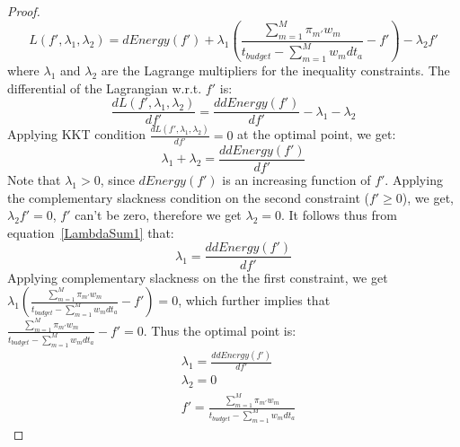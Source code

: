 \documentclass[11pt, letterpaper]{article}
\begin{document}
\begin{proof}
\begin{displaymath}
L(f', \lambda_1, \lambda_2) = dEnergy(f') +  \lambda_1(\frac{\sum_{m=1}^{M}\pi_{m'}w_m}{t_{budget} - \sum_{m=1}^{M}w_mdt_a} -f') -\lambda_2f'
\end{displaymath}
where $\lambda_1$ and $\lambda_2$ are the Lagrange multipliers for the inequality constraints.
The differential of the Lagrangian w.r.t. $f'$ is:
\begin{displaymath}
     \frac{d L(f', \lambda_1, \lambda_2)}{df'} =  \frac{ddEnergy(f')}{df'}  -\lambda_1 -\lambda_2
\end{displaymath}
Applying KKT condition  $\frac{d L(f', \lambda_1, \lambda_2)}{df'} = 0$ at the optimal point, we get:
\begin{equation}\label{LambdaSum1}
    \lambda_1 + \lambda_2  =  \frac{ddEnergy(f')}{df'}  
\end{equation}
Note that $\lambda_1 > 0$, since $dEnergy(f')$ is an increasing function of $f'$.
Applying the complementary slackness condition on the second constraint ($f' \geq 0$), we get, $\lambda_2f' = 0$, $f'$ can't be zero, therefore we get  $\lambda_2 = 0$. It follows thus from equation~\ref{LambdaSum1}  that:
\begin{displaymath}
\lambda_1 =  \frac{ddEnergy(f')}{df'}  
\end{displaymath}
Applying complementary slackness on the the first constraint, we get $\lambda_1(\frac{\sum_{m=1}^{M}\pi_{m'}w_m}{t_{budget} - \sum_{m=1}^{M}w_mdt_a} -f') = 0$, which further implies that $\frac{\sum_{m=1}^{M}\pi_{m'}w_m}{t_{budget} - \sum_{m=1}^{M}w_mdt_a} -f' = 0$.
Thus the optimal point is:
\begin{displaymath}
\begin{aligned}
&\lambda_1 =  \frac{ddEnergy(f')}{df'} \\
&\lambda_2 = 0\\
&f' = \frac{\sum_{m=1}^{M}\pi_{m'}w_m}{t_{budget} - \sum_{m=1}^{M}w_mdt_a}
\end{aligned}
\end{displaymath}
\end{proof}
\end{document}
